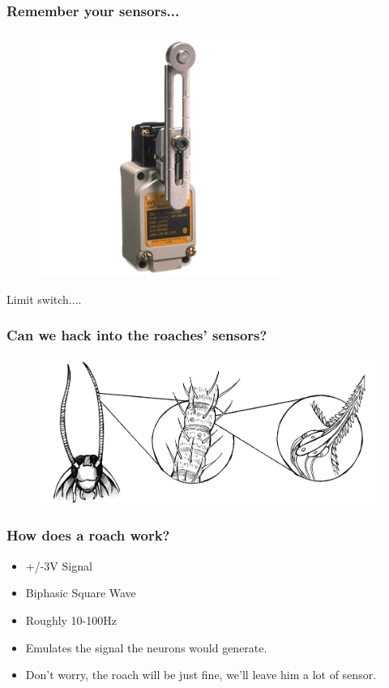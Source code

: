 \documentclass[compress]{beamer}
\begin{document}
\begin{frame}
  \frametitle{Remember your sensors...}
  \begin{figure}
    \includegraphics[width=0.4\linewidth]{limit.jpg}
  \end{figure}     
  \begin{center}
    Limit switch.... 
  \end{center}
\end{frame}
\begin{frame}
  \frametitle{Can we hack into the roaches' sensors?}
  \begin{figure}
    \includegraphics[width=0.8\linewidth]{combo2.jpg}
  \end{figure}     
\end{frame}
\begin{frame}
  \frametitle{How does a roach work?}
  \begin{itemize}
    \item +/-3V Signal
    \item Biphasic Square Wave
    \item Roughly 10-100Hz 
    \item Emulates the signal the neurons would generate. 
    \item Don't worry, the roach will be just fine, we'll leave him a lot of sensor.
    \end{itemize}
\end{frame}
\end{document}
